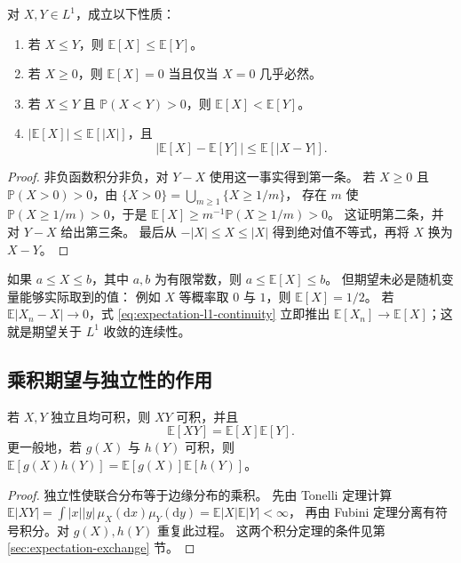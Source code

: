 \documentclass[UTF8]{ctexart}
\begin{document}
\begin{proposition}[保序与绝对值控制]
\label{prop:expectation-order}
对 $X,Y\in L^1$，成立以下性质：
\begin{enumerate}
  \item 若 $X\leq Y$，则 $\mathbb E[X]\leq\mathbb E[Y]$。
  \item 若 $X\geq0$，则 $\mathbb E[X]=0$ 当且仅当 $X=0$ 几乎必然。
  \item 若 $X\leq Y$ 且 $\mathbb P(X<Y)>0$，则 $\mathbb E[X]<\mathbb E[Y]$。
  \item $|\mathbb E[X]|\leq\mathbb E[|X|]$，且
  \begin{equation}
    |\mathbb E[X]-\mathbb E[Y]|\leq\mathbb E[|X-Y|].
    \label{eq:expectation-l1-continuity}
  \end{equation}
\end{enumerate}
\end{proposition}

\begin{proof}
非负函数积分非负，对 $Y-X$ 使用这一事实得到第一条。
若 $X\geq0$ 且 $\mathbb P(X>0)>0$，由
$\{X>0\}=\bigcup_{m\geq1}\{X\geq1/m\}$，
存在 $m$ 使 $\mathbb P(X\geq1/m)>0$，于是
$\mathbb E[X]\geq m^{-1}\mathbb P(X\geq1/m)>0$。
这证明第二条，并对 $Y-X$ 给出第三条。
最后从 $-|X|\leq X\leq|X|$ 得到绝对值不等式，再将 $X$ 换为 $X-Y$。
\end{proof}

如果 $a\leq X\leq b$，其中 $a,b$ 为有限常数，则 $a\leq\mathbb E[X]\leq b$。
但期望未必是随机变量能够实际取到的值：
例如 $X$ 等概率取 $0$ 与 $1$，则 $\mathbb E[X]=1/2$。
若 $\mathbb E|X_n-X|\to0$，式 \eqref{eq:expectation-l1-continuity} 立即推出
$\mathbb E[X_n]\to\mathbb E[X]$；这就是期望关于 $L^1$ 收敛的连续性。

\subsection{乘积期望与独立性的作用}

\begin{proposition}[独立变量的乘积]
\label{prop:expectation-independent-product}
若 $X,Y$ 独立且均可积，则 $XY$ 可积，并且
\begin{equation}
  \mathbb E[XY]=\mathbb E[X]\mathbb E[Y].
  \label{eq:expectation-product}
\end{equation}
更一般地，若 $g(X)$ 与 $h(Y)$ 可积，则
$\mathbb E[g(X)h(Y)]=\mathbb E[g(X)]\mathbb E[h(Y)]$。
\end{proposition}

\begin{proof}
独立性使联合分布等于边缘分布的乘积。
先由 Tonelli 定理计算
$\mathbb E|XY|=\int|x||y|\,\mu_X(\mathrm dx)\mu_Y(\mathrm dy)
=\mathbb E|X|\mathbb E|Y|<\infty$，
再由 Fubini 定理分离有符号积分。对 $g(X),h(Y)$ 重复此过程。
这两个积分定理的条件见第 \ref{sec:expectation-exchange} 节。
\end{proof}
\end{document}
